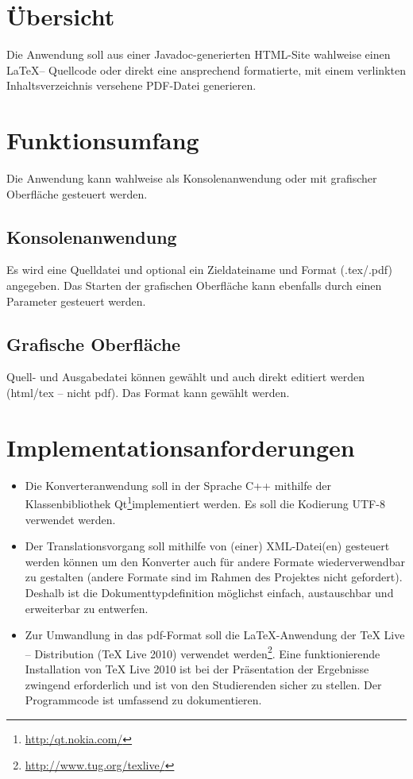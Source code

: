 \documentclass[	a4paper,		%
		titlepage, 		%
		fontsize=12pt		%
		]{scrartcl} 		%
\begin{document}
\section{Übersicht}
Die Anwendung soll aus einer Javadoc-generierten HTML-Site wahlweise einen \LaTeX -- Quellcode oder direkt eine ansprechend formatierte, mit einem verlinkten Inhaltsverzeichnis versehene PDF-Datei generieren.


\section{Funktionsumfang}
Die Anwendung kann wahlweise als Konsolenanwendung oder mit grafischer Oberfläche gesteuert werden.

\subsection{Konsolenanwendung}
Es wird eine Quelldatei und optional ein Zieldateiname und Format (.tex/.pdf) angegeben. Das Starten der grafischen Oberfläche kann ebenfalls durch einen Parameter gesteuert werden.

\subsection{Grafische Oberfläche}
Quell- und Ausgabedatei können gewählt und auch direkt editiert werden (html/tex -- nicht pdf). Das Format kann gewählt werden.


\section{Implementationsanforderungen}
\begin{itemize}
 \item Die Konverteranwendung soll in der Sprache C++ mithilfe der Klassenbibliothek Qt\footnote{\href{http:/qt.nokia.com/}{http:/qt.nokia.com/}  }implementiert werden.
Es soll die Kodierung UTF-8 verwendet werden.
\item Der Translationsvorgang soll mithilfe von (einer) XML-Datei(en) gesteuert werden können um den Konverter auch für andere Formate wiederverwendbar zu gestalten (andere Formate sind im Rahmen des Projektes nicht gefordert). Deshalb ist die Dokumenttypdefinition möglichst einfach, austauschbar und erweiterbar zu entwerfen.
\item Zur Umwandlung in das pdf-Format soll die \LaTeX{}-Anwendung der TeX Live -- Distribution (TeX Live 2010) verwendet werden\footnote{\href{http://www.tug.org/texlive/}{http://www.tug.org/texlive/}}. Eine funktionierende Installation von TeX Live 2010 ist bei der Präsentation der Ergebnisse zwingend erforderlich und ist von den Studierenden sicher zu stellen.
Der Programmcode ist umfassend zu dokumentieren.
\end{itemize}
\begin{figure} [H]
\centering
\resizebox*{.70\textheight}{!}{}
\end{figure}
\end{document}
